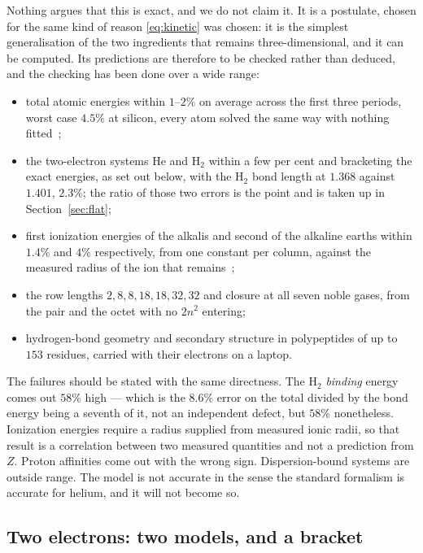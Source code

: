 \documentclass[11pt]{article}
\begin{document}
Nothing argues that this is exact, and we do not claim it. It is a postulate, chosen for the same
kind of reason \eqref{eq:kinetic} was chosen: it is the simplest generalisation of the two
ingredients that remains three-dimensional, and it can be computed. Its predictions are therefore
to be checked rather than deduced, and the checking has been done over a wide range:

\begin{itemize}\itemsep2pt
\item total atomic energies within $1$--$2\%$ on average across the first three periods, worst case
  $4.5\%$ at silicon, every atom solved the same way with nothing fitted~\cite{Johnson-atoms};
\item the two-electron systems He and H$_2$ within a few per cent and bracketing the exact
  energies, as set out below, with the H$_2$ bond length at $1.368$ against $1.401$, $2.3\%$;
  the ratio of those two errors is the point and is taken up in Section~\ref{sec:flat};
\item first ionization energies of the alkalis and second of the alkaline earths within $1.4\%$ and
  $4\%$ respectively, from one constant per column, against the measured radius of the ion that
  remains~\cite{Johnson-ionization};
\item the row lengths $2,8,8,18,18,32,32$ and closure at all seven noble gases, from the pair and
  the octet with no $2n^2$ entering;
\item hydrogen-bond geometry and secondary structure in polypeptides of up to $153$ residues,
  carried with their electrons on a laptop.
\end{itemize}

The failures should be stated with the same directness. The H$_2$ \emph{binding} energy comes out
$58\%$ high --- which is the $8.6\%$ error on the total divided by the bond energy being a seventh
of it, not an independent defect, but $58\%$ nonetheless. Ionization energies require a radius
supplied from measured ionic radii, so that result is a correlation between two measured
quantities and not a prediction from $Z$. Proton affinities come out with the wrong sign.
Dispersion-bound systems are outside range. The model is not accurate in the sense the standard
formalism is accurate for helium, and it will not become so.

\subsection*{Two electrons: two models, and a bracket}
\end{document}
